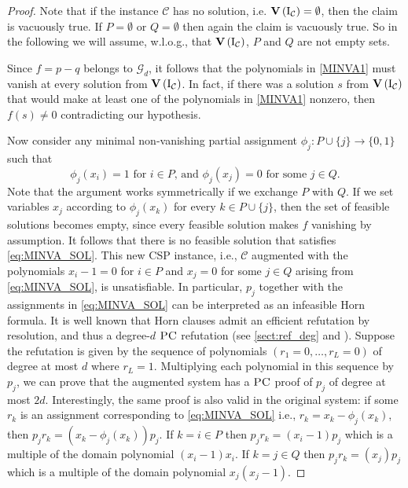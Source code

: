 \documentclass[11pt]{article}
\newcommand{\Cc}{\mathcal{C}}
\newcommand{\PC}{\textsc{PC}}
\newcommand{\Variety}[1]{{\textbf{V}}\left( #1 \right)}
\newcommand{\I}{\emph{$\rm{I}$}}
\newcommand{\1}{\textbf{1}}
\begin{document}
\begin{proof}
Note that if the instance $\Cc$ has no solution, i.e. $\Variety{\I_\Cc}=\emptyset$, then the claim is vacuously true. If $P=\emptyset$ or $Q=\emptyset$ then again the claim is vacuously true. So in the following we will assume, w.l.o.g., that $\Variety{\I_\Cc}$, $P$ and $Q$ are not empty sets.

Since $f=p-q$ belongs to $\mathcal{G}_d$, it follows that the polynomials in \eqref{MINVA1} must vanish at every solution from $\Variety{\I_\Cc}$. In fact, if there {was} a solution $s$ from $\Variety{\I_\Cc}$ that would make at least one of the polynomials in \eqref{MINVA1} nonzero, then $f(s)\not=0$ contradicting our hypothesis.

Now consider any minimal non-vanishing partial assignment $\phi_j:P\cup\{j\}\rightarrow \{0,1\}$ such that
\begin{equation}\label{eq:MINVA_SOL}
    \phi_j(x_i)=1 \text{ for } i\in P\text{, and  } {\phi_j(x_j) = 0} \text{ for some }j \in Q. 
\end{equation}
%
Note that the argument works symmetrically if we exchange $P$ with $Q$. If we set variables {$x_j$} according to {$\phi_j(x_k)$} for every $k \in P \cup \{j\}$, then the set of feasible solutions becomes empty, since every feasible solution makes $f$ vanishing by assumption. It follows that there is no feasible solution that satisfies \eqref{eq:MINVA_SOL}. This new CSP instance, i.e., $\Cc$ augmented with the polynomials $x_i - 1 = 0$ for $i \in P$ and $x_j = 0$ for some $j \in Q$ arising from \cref{eq:MINVA_SOL}, is unsatisfiable.
In particular, $p_j$ together with the assignments in \cref{eq:MINVA_SOL} can be interpreted as an infeasible Horn formula. It is well known that Horn clauses admit an efficient refutation by resolution, and thus a degree-$d$ $\PC$ refutation (see \cref{sect:ref_deg} and \cite{FlemingKothariPitassi19}). Suppose the refutation is given by the sequence of polynomials $(r_1=0,\dots,r_L=0)$ of degree at most $d$ where $r_L=1$. Multiplying each polynomial in this sequence by $p_j$, we can prove that the augmented system has a $\PC$ proof of $p_j$ of degree at most $2d$. Interestingly, the same proof is also valid in the original system: if some $r_k$ is an assignment corresponding to \cref{eq:MINVA_SOL} i.e., $r_k = x_k - \phi_j(x_k)$, then $p_j r_k = (x_k - \phi_j(x_k))p_j$. If $k = i \in P$ then $p_jr_k=(x_i-1)p_j$ which is a multiple of the domain polynomial $(x_i-1)x_i$. If $k = j \in Q$ then $p_jr_k=(x_j)p_j$ which is a multiple of the domain polynomial $x_j(x_j-1)$.

\end{proof}
\end{document}
